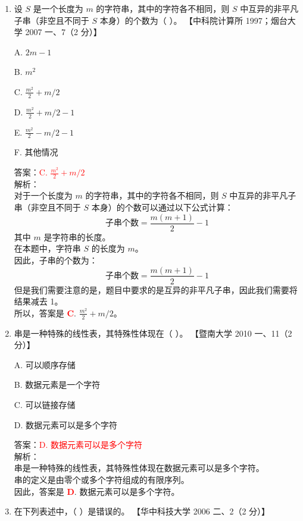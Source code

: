 \documentclass[lang=cn,newtx,10pt,scheme=chinese]{../../../elegantbook}
\begin{document}
\begin{enumerate}
    \item 设 $S$ 是一个长度为 $m$ 的字符串，其中的字符各不相同，则 $S$ 中互异的非平凡子串（非空且不同于 $S$ 本身）的个数为（ ）。  
    【中科院计算所 1997；烟台大学 2007 一、7（2 分）】  

    A. $2m - 1$  

    B. $m^2$  

    C. $\frac{m^2}{2} + m/2$  

    D. $\frac{m^2}{2} + m/2 - 1$  

    E. $\frac{m^2}{2} - m/2 - 1$  

    F. 其他情况  

    答案：\textcolor{red}{C. $\frac{m^2}{2} + m/2$}\\
    解析：\\
    对于一个长度为 $m$ 的字符串，其中的字符各不相同，则 $S$ 中互异的非平凡子串（非空且不同于 $S$ 本身）的个数可以通过以下公式计算：\\
    \[
    \text{子串个数} = \frac{m(m+1)}{2} - 1
    \]
    其中 $m$ 是字符串的长度。\\
    在本题中，字符串 $S$ 的长度为 $m$。\\
    因此，子串的个数为：\\
    \[
        \text{子串个数} = \frac{m(m+1)}{2} - 1
    \]
    但是我们需要注意的是，题目中要求的是互异的非平凡子串，因此我们需要将结果减去 1。\\
    所以，答案是 \textbf{\textcolor{red}{C}}. $\frac{m^2}{2} + m/2$。\\

    \item 串是一种特殊的线性表，其特殊性体现在（ ）。  
    【暨南大学 2010 一、11（2 分）】  

    A. 可以顺序存储  

    B. 数据元素是一个字符  

    C. 可以链接存储  

    D. 数据元素可以是多个字符  

    答案：\textcolor{red}{D. 数据元素可以是多个字符}\\
    解析：\\
    串是一种特殊的线性表，其特殊性体现在数据元素可以是多个字符。\\
    串的定义是由零个或多个字符组成的有限序列。\\
    因此，答案是 \textbf{\textcolor{red}{D}}. 数据元素可以是多个字符。\\

    \item 在下列表述中，（ ）是错误的。  
    【华中科技大学 2006 二、2（2 分）】  



\end{enumerate}
\end{document}

